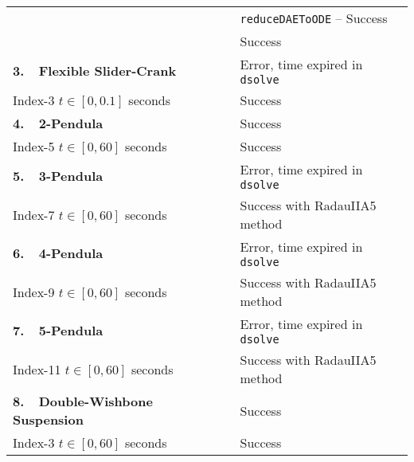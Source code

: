 {\begin{longtable}{lccl}
    &                            & \mycheckmark{}\phantom{\mywarnmark{}} & \texttt{reduceDAEToODE} -- Success \\ \cmidrule{2-4}\cmidrule{2-4}
    & \Indigo{} & \mycheckmark{}\phantom{\mywarnmark{}} & Success \\ \midrule
  \multirow{1}{*}{\textbf{3.~~Flexible Slider-Crank~\cite{lioen1998test, mazzia2008test}}}
    & \Maple{}  & \mycrossmark{}\phantom{\mywarnmark{}} & Error, time expired in \texttt{dsolve} \\ \cmidrule{2-4}
    Index-3 \quad $t \in [0, 0.1]$ seconds & \Indigo{} & \mycheckmark{}\phantom{\mywarnmark{}} & Success \\ \midrule
  \multirow{1}{*}{\textbf{4.~~2-Pendula~\cite{pryce1998solving}}}
    & \Maple{}  & \mycheckmark{}\phantom{\mywarnmark{}} & Success \\ \cmidrule{2-4}
    Index-5 \quad $t \in [0, 60]$ seconds & \Indigo{} & \mycheckmark{}\phantom{\mywarnmark{}} & Success \\ \midrule
  \multirow{1}{*}{\textbf{5.~~3-Pendula~\cite{nedialkov2008solvingIII}}}
    & \Maple{}  & \mycrossmark{}\phantom{\mywarnmark{}} & Error, time expired in \texttt{dsolve} \\ \cmidrule{2-4}
    Index-7 \quad $t \in [0, 60]$ seconds & \Indigo{} & \mycheckmark{}\mywarnmark{} & Success with RadauIIA5 method \\ \midrule
  \multirow{1}{*}{\textbf{6.~~4-Pendula~\cite{nedialkov2008solvingIII}}}
    & \Maple{}  & \mycrossmark{}\phantom{\mywarnmark{}} & Error, time expired in \texttt{dsolve} \\ \cmidrule{2-4}
    Index-9 \quad $t \in [0, 60]$ seconds & \Indigo{} & \mycheckmark{}\mywarnmark{} & Success with RadauIIA5 method \\ \midrule
  \multirow{1}{*}{\textbf{7.~~5-Pendula~\cite{nedialkov2008solvingIII}}}
    & \Maple{}  & \mycrossmark{}\phantom{\mywarnmark{}} & Error, time expired in \texttt{dsolve} \\ \cmidrule{2-4}
    Index-11 \quad $t \in [0, 60]$ seconds & \Indigo{} & \mycheckmark{}\mywarnmark{} & Success with RadauIIA5 method \\ \midrule
  \multirow{1}{*}{\textbf{8.~~Double-Wishbone Suspension~\cite{larcher2024imece_symbolic, stocco2024trussme}}}
    & \Maple{}  & \mycheckmark{}\phantom{\mywarnmark{}} & Success \\ \cmidrule{2-4}
    Index-3 \quad $t \in [0, 60]$ seconds & \Indigo{} & \mycheckmark{}\phantom{\mywarnmark{}} & Success \\ \midrule

\end{longtable}}
